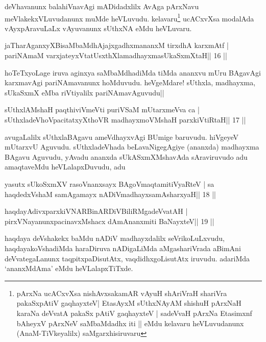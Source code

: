 \begin{artha}
deVhavanunx balahiVnavAgi mADidadxlilx AvAga pArxNavu
meVlakekxVLuvudanunx muMde heVLuvudu. kelavaru\footnote{pArxNa
ucACxvXsa nishAvxsakamAR vAyuH shAriVraH shariVra pakaSxpAtiV
gaqhayxteV| EtasAyxM sUthxNAyAM shishuH pArxNaH karaNa deVvatA
pakaSx pAtiV gaqhayxteV | sadeVvaH pArxNa Etasimxnf bAheyxV pArxNeV
saMbaMdadhx iti || eMdu kelavaru heVLuvudanunx (AnaM-TiVkeyalilx) saMgarxhisiruvaru} ucACxvXsa modalAda
vAyxpAravuLaLx vAyuvanunx sUthxNA eMdu heVLuvaru.
\end{artha}

\begin{shl}
jaTharAganxyXBisaMbaMdhAjajxgadhxmananxM tirxdhA karxmAtf |
pariNAmaM varxjateyxVtatUsxthXlamadhayxmasUkaSxmXtaH\hfill || 16 ||
\end{shl}

\begin{artha}
hoTeTxyoLage iruva aginxya saMbaMdhadiMda tiMda ananxvu mUru BAgavAgi
karxmavAgi pariNAmavanunx hoMduvudu. heVgeMdare! sUthxla, madhayxma,
sUkaSxmX eMba riVtiyalilx pariNAmavAguvudu|| 
\end{artha}

\begin{shl}
sUthxlAMshaH paqthiviVmeVti puriVSaM mUtarxmeVva ca |
sUthxladeVhoVpacitatxyXthoVR madhayxmoVM\s shaH parxkiVtiRtaH\hfill || 17 ||
\end{shl}

\begin{artha}
avugaLalilx sUthxlaBAgavu ameVdhayxvAgi BUmige baruvudu. hiVgeyeV mUtarxvU
Aguvudu. sUthxladeVhada beLavaNigegAgiye (ananxda) madhayxma BAgavu
Aguvudu, yAvadu ananxda sUkASxmXMshavAda sAraviruvudo adu amaqtaveMdu
heVLalapxDuvudu, adu 
\end{artha}

\begin{shl}
yasutx sUkoSxmXV rasoV\s nanxsayx BAgoV\s maqtamitiVyaRteV |
sa haqdedxVshaM samAgamayx nADiVmadhayxsamAsharxyaH\hfill || 18 ||
\end{shl}

\begin{shl}
haqdayAdivxparxkiVNARBinARDiVBiliRMgadeVvatAH |
pirxVNayanunxpacinavxMshacx dAmAnanxmiti BaNayxteV\hfill || 19 ||
\end{shl}

\begin{artha}
haqdaya deVshakekx baMdu nADiV madhayxdalilx seVrikoLuLxvudu, haqdayakoVshadiMda haraDiruva nADigaLiMda aMgashariVrada aBimAni deVvategaLanunx taqpitxpaDisutAtx, vaqdidhxgoLisutAtx iruvudu. adariMda `ananxMdAma' eMdu heVLalapxTiTxde.
\end{artha}

